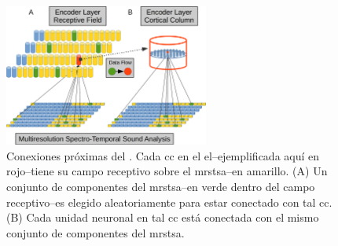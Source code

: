 \begin{figure}[h!]
    \centering
    \includegraphics[width=0.6\textwidth]{EncoderProximalConnections.png}
    \caption{Conexiones próximas del . Cada \gls{cc} en el \gls{el}--ejemplificada aquí en rojo--tiene su campo receptivo sobre el \gls{mrstsa}--en amarillo.
    (A) Un conjunto de componentes del \gls{mrstsa}--en verde dentro del campo receptivo--es elegido aleatoriamente para estar conectado con tal \gls{cc}.
    (B) Cada unidad neuronal en tal \gls{cc} está conectada con el mismo conjunto de componentes del \gls{mrstsa}.}
    \label{fig:EncoderProximalConnections}
\end{figure}

